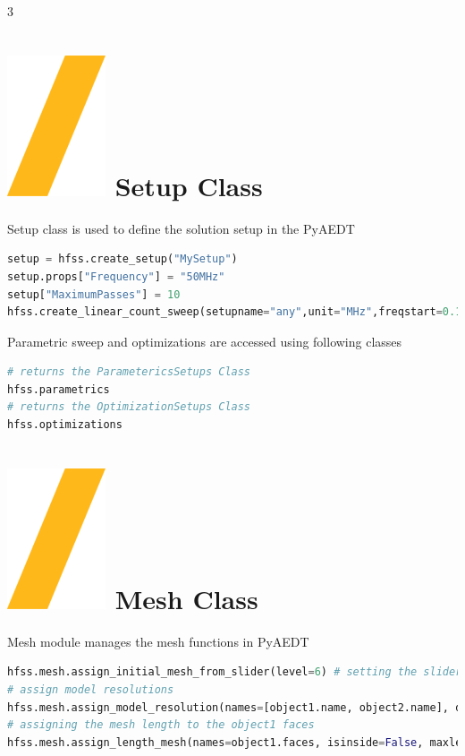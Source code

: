 \documentclass[9pt,landscape]{article}
\begin{document}
\begin{multicols}{3}
\section{\includegraphics[height=\fontcharht\font`\S]{slash.png} Setup Class}
Setup class is used to define the solution setup in the PyAEDT

\begin{lstlisting}[language=Python]
setup = hfss.create_setup("MySetup")
setup.props["Frequency"] = "50MHz"
setup["MaximumPasses"] = 10
hfss.create_linear_count_sweep(setupname="any",unit="MHz",freqstart=0.1,freqstop=100,num_of_freq_points=100, sweepname="sweep1",sweep_type="Interpolating", save_fields=False)
\end{lstlisting}
Parametric sweep and optimizations are accessed using following classes
\begin{lstlisting}[language=Python]
# returns the ParametericsSetups Class
hfss.parametrics
# returns the OptimizationSetups Class
hfss.optimizations
\end{lstlisting}
\columnbreak
\section{\includegraphics[height=\fontcharht\font`\S]{slash.png} Mesh Class}
Mesh module manages the mesh functions in PyAEDT
\begin{lstlisting}[language=Python]
hfss.mesh.assign_initial_mesh_from_slider(level=6) # setting the slider level to 6
# assign model resolutions
hfss.mesh.assign_model_resolution(names=[object1.name, object2.name], defeature_length=None)
# assigning the mesh length to the object1 faces
hfss.mesh.assign_length_mesh(names=object1.faces, isinside=False, maxlength=1, maxel=2000)
\end{lstlisting}


\end{multicols}
\end{document}
